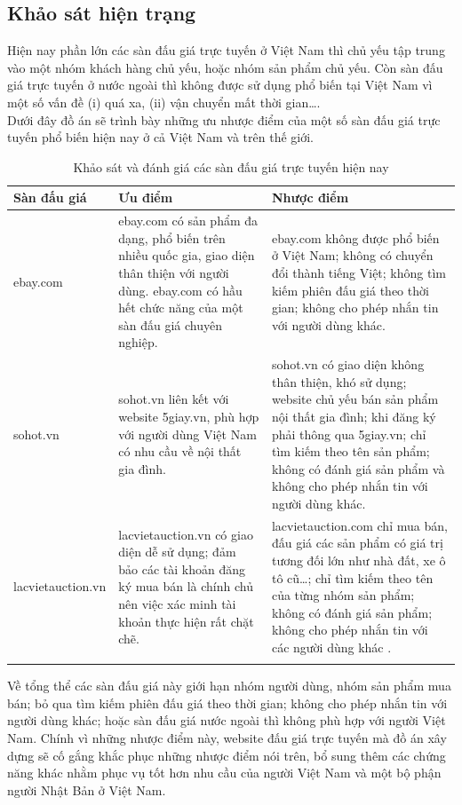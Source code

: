 \documentclass{article}
\begin{document}
\subsection{Khảo sát hiện trạng}
Hiện nay phần lớn các sàn đấu giá trực tuyến ở Việt Nam thì chủ yếu tập trung vào một nhóm khách hàng chủ yếu, hoặc nhóm sản phẩm chủ yếu. Còn sàn đấu giá trực tuyến ở nước ngoài thì không được sử dụng phổ biến tại Việt Nam vì một số vấn đề (i) quá xa, (ii) vận chuyển mất thời gian….\\
Dưới đây đồ án sẽ trình bày những ưu nhược điểm của một số sàn đấu giá trực tuyến phổ biến hiện nay ở cả Việt Nam và trên thế giới. \\
    \begin{longtable}{| p{} | p{} | p{} |} 
    \hline
        \bfseries Sàn đấu giá & \bfseries Ưu điểm &  \bfseries Nhược điểm\\\hline
        ebay.com &  ebay.com có sản phẩm đa dạng, phổ biến trên nhiều quốc gia, giao diện thân thiện với người dùng.
        ebay.com có hầu hết chức năng của một sàn đấu giá chuyên nghiệp.
        &  ebay.com không được phổ biến ở Việt Nam; không có chuyển đổi thành tiếng Việt; không tìm kiếm phiên đấu giá theo thời gian; không cho phép nhắn tin với người dùng khác.\\\hline
        sohot.vn &  sohot.vn liên kết với website 5giay.vn, phù hợp với người dùng Việt Nam có nhu cầu về nội thất gia đình.&  sohot.vn có giao diện không thân thiện, khó sử dụng; website chủ yếu bán sản phẩm nội thất gia đình; khi đăng ký phải thông qua 5giay.vn; chỉ tìm kiếm theo tên sản phẩm; không có đánh giá sản phẩm và không cho phép nhắn tin với người dùng khác.\\\hline
        lacvietauction.vn & lacvietauction.vn có giao diện dễ sử dụng; đảm bảo các tài khoản đăng ký mua bán là chính chủ nên việc xác minh tài khoản thực hiện rất chặt chẽ. & lacvietauction.com chỉ mua bán, đấu giá các sản phẩm có giá trị tương đối lớn như nhà đất, xe ô tô cũ…; chỉ tìm kiếm theo tên của từng nhóm sản phẩm; không có đánh giá sản phẩm; không cho phép nhắn tin với các người dùng khác .\\\hline
        \caption{Khảo sát và đánh giá các sàn đấu giá trực tuyến hiện nay}
    \label{bang21}
    \end{longtable}
Về tổng thể các sàn đấu giá này giới hạn nhóm người dùng, nhóm sản phẩm mua bán; bỏ qua tìm kiếm phiên đấu giá theo thời gian; không cho phép nhắn tin với người dùng khác; hoặc sàn đấu giá nước ngoài thì không phù hợp với người Việt Nam. Chính vì những nhược điểm này, website đấu giá trực tuyến mà đồ án xây dựng sẽ cố gắng khắc phục những nhược điểm nói trên, bổ sung thêm các chứng năng khác nhằm phục vụ tốt hơn nhu cầu của người Việt Nam và một bộ phận người Nhật Bản ở Việt Nam.\\
\end{document}
